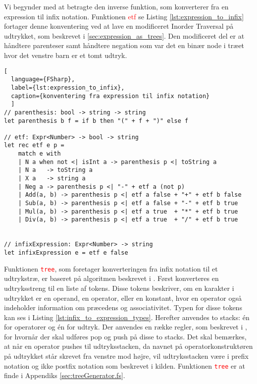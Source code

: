 \documentclass{article}
\begin{document}
Vi begynder med at betragte den inverse funktion, som konverterer fra en expression til infix notation. Funktionen \textcolor{red}{etf} se Listing \ref{lst:expression_to_infix} fortager denne konventering ved at lave en modificeret Inorder Traversal på udtrykket, som beskrevet i \ref{sec:expression_as_trees}. Den modificeret del er at håndtere parenteser samt håndtere negation som var det en binær node i træet hvor det venstre barn er et tomt udtryk.

\begin{lstlisting}[
  language={FSharp}, 
  label={lst:expression_to_infix}, 
  caption={konventering fra expression til infix notation}
  ]
// parenthesis: bool -> string -> string
let parenthesis b f = if b then "(" + f + ")" else f

// etf: Expr<Number> -> bool -> string
let rec etf e p =
    match e with
    | N a when not <| isInt a -> parenthesis p <| toString a
    | N a   -> toString a
    | X a   -> string a
    | Neg a -> parenthesis p <| "-" + etf a (not p) 
    | Add(a, b) -> parenthesis p <| etf a false + "+" + etf b false
    | Sub(a, b) -> parenthesis p <| etf a false + "-" + etf b true
    | Mul(a, b) -> parenthesis p <| etf a true  + "*" + etf b true
    | Div(a, b) -> parenthesis p <| etf a true  + "/" + etf b true


// infixExpression: Expr<Number> -> string
let infixExpression e = etf e false
\end{lstlisting}

Funktionen \textcolor{red}{\texttt{tree}}, som foretager konverteringen fra infix notation til et udtrykstræ, er baseret på algoritmen beskrevet i \cite{convert_expression}. Først konverteres en udtryksstreng til en liste af tokens. Disse tokens beskriver, om en karakter i udtrykket er en operand, en operator, eller en konstant, hvor en operator også indeholder information om præcedens og associativitet. Typen for disse tokens kan ses i Listing \ref{lst:infix_to_expression_types}. Herefter anvendes to stacks: én for operatorer og én for udtryk. Der anvendes en række regler, som beskrevet i \cite{convert_expression}, for hvornår der skal udføres pop og push på disse to stacks. Det skal bemærkes, at når en operator pushes til udtryksstacken, da navnet på operatorkonstruktøren på udtrykket står skrevet fra venstre mod højre, vil udtryksstacken være i prefix notation og ikke postfix notation som beskrevet i kilden. Funktionen \textcolor{red}{\texttt{tree}} er at finde i Appendiks \ref{sec:treeGenerator.fs}.
\end{document}
